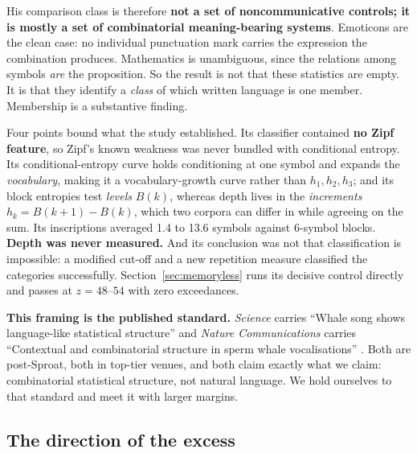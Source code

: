 \documentclass[11pt,a4paper]{article}
\begin{document}
His comparison class is therefore \textbf{not a set of noncommunicative controls; it is
mostly a set of combinatorial meaning-bearing systems}. Emoticons are the clean case: no
individual punctuation mark carries the expression the combination produces. Mathematics
is unambiguous, since the relations among symbols \emph{are} the proposition. So the
result is not that these statistics are empty. It is that they identify a \emph{class}
of which written language is one member. Membership is a substantive finding.

Four points bound what the study established. Its classifier contained \textbf{no Zipf
feature}, so Zipf's known weakness was never bundled with conditional entropy. Its
conditional-entropy curve holds conditioning at one symbol and expands the
\emph{vocabulary}, making it a vocabulary-growth curve rather than $h_1, h_2, h_3$; and
its block entropies test \emph{levels} $B(k)$, whereas depth lives in the
\emph{increments} $h_k = B(k{+}1) - B(k)$, which two corpora can differ in while
agreeing on the sum. Its inscriptions averaged 1.4 to 13.6 symbols against 6-symbol
blocks. \textbf{Depth was never measured.} And its conclusion was not that
classification is impossible: a modified cut-off and a new repetition measure classified
the categories successfully. Section~\ref{sec:memoryless} runs its decisive control
directly and passes at $z = 48$--$54$ with zero exceedances.

\textbf{This framing is the published standard.} \emph{Science} carries ``Whale song
shows language-like statistical structure'' \cite{arnon2025} and \emph{Nature
Communications} carries ``Contextual and combinatorial structure in sperm whale
vocalisations'' \cite{sharma2024}. Both are post-Sproat, both in top-tier venues, and
both claim exactly what we claim: combinatorial statistical structure, not natural
language. We hold ourselves to that standard and meet it with larger margins.

\subsection{The direction of the excess}
\label{sec:excess}
\end{document}

